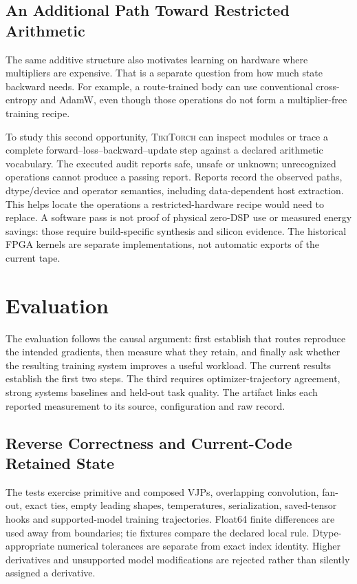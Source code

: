\documentclass{article}
\theoremstyle{plain}
\theoremstyle{definition}
\theoremstyle{remark}
\newcommand{\ttorch}{\textsc{TikiTorch}}
\begin{document}
\subsection{An Additional Path Toward Restricted Arithmetic}

The same additive structure also motivates learning on hardware where
multipliers are expensive. That is a separate question from how much state
backward needs. For example, a route-trained body can use conventional
cross-entropy and AdamW, even though those operations do not form a
multiplier-free training recipe.

To study this second opportunity, \ttorch{} can inspect modules or trace
a complete forward--loss--backward--update step against a declared
arithmetic vocabulary. The executed audit reports safe, unsafe or unknown;
unrecognized operations cannot produce a passing report. Reports record
the observed paths, dtype/device and operator semantics, including
data-dependent host extraction. This helps locate the operations a
restricted-hardware recipe would need to replace. A software pass is not
proof of physical zero-DSP use or measured energy savings: those require
build-specific synthesis and silicon evidence. The historical FPGA kernels
are separate implementations, not automatic exports of the current tape.

\section{Evaluation}
\label{sec:evaluation}

The evaluation follows the causal argument: first establish that routes
reproduce the intended gradients, then measure what they retain, and
finally ask whether the resulting training system improves a useful
workload. The current results establish the first two steps. The third
requires optimizer-trajectory agreement, strong systems baselines and
held-out task quality. The artifact links each reported measurement to
its source, configuration and raw record.

\subsection{Reverse Correctness and Current-Code Retained State}

The tests exercise primitive and composed VJPs, overlapping convolution,
fan-out, exact ties, empty leading shapes, temperatures, serialization,
saved-tensor hooks and supported-model training trajectories. Float64 finite
differences are used away from boundaries; tie fixtures compare the declared
local rule. Dtype-appropriate numerical tolerances are separate from exact
index identity. Higher derivatives and unsupported model modifications are
rejected rather than silently assigned a derivative.
\end{document}
